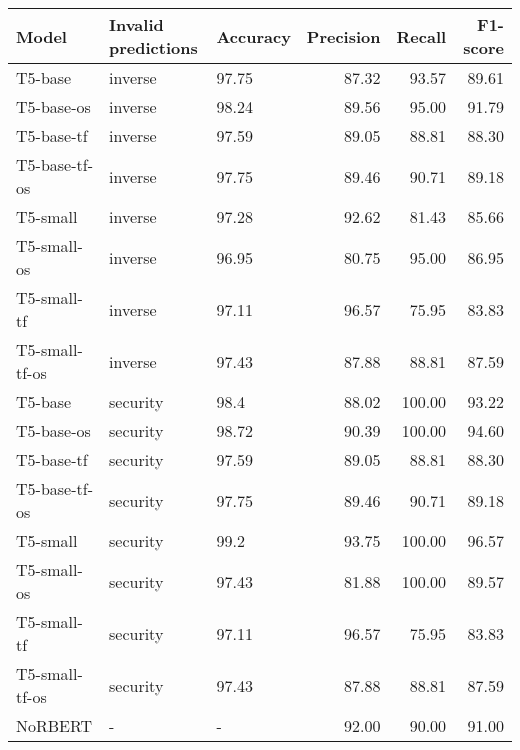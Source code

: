 \begin{tabular}{lllrrr}
\toprule
         Model & Invalid predictions & Accuracy &  Precision &  Recall &  F1-score \\
\midrule
       T5-base &             inverse &    97.75 &      87.32 &   93.57 &     89.61 \\
    T5-base-os &             inverse &    98.24 &      89.56 &   95.00 &     91.79 \\
    T5-base-tf &             inverse &    97.59 &      89.05 &   88.81 &     88.30 \\
 T5-base-tf-os &             inverse &    97.75 &      89.46 &   90.71 &     89.18 \\
      T5-small &             inverse &    97.28 &      92.62 &   81.43 &     85.66 \\
   T5-small-os &             inverse &    96.95 &      80.75 &   95.00 &     86.95 \\
   T5-small-tf &             inverse &    97.11 &      96.57 &   75.95 &     83.83 \\
T5-small-tf-os &             inverse &    97.43 &      87.88 &   88.81 &     87.59 \\
       T5-base &            security &     98.4 &      88.02 &  100.00 &     93.22 \\
    T5-base-os &            security &    98.72 &      90.39 &  100.00 &     94.60 \\
    T5-base-tf &            security &    97.59 &      89.05 &   88.81 &     88.30 \\
 T5-base-tf-os &            security &    97.75 &      89.46 &   90.71 &     89.18 \\
      T5-small &            security &     99.2 &      93.75 &  100.00 &     96.57 \\
   T5-small-os &            security &    97.43 &      81.88 &  100.00 &     89.57 \\
   T5-small-tf &            security &    97.11 &      96.57 &   75.95 &     83.83 \\
T5-small-tf-os &            security &    97.43 &      87.88 &   88.81 &     87.59 \\
       NoRBERT &                   - &        - &      92.00 &   90.00 &     91.00 \\
\bottomrule
\end{tabular}
